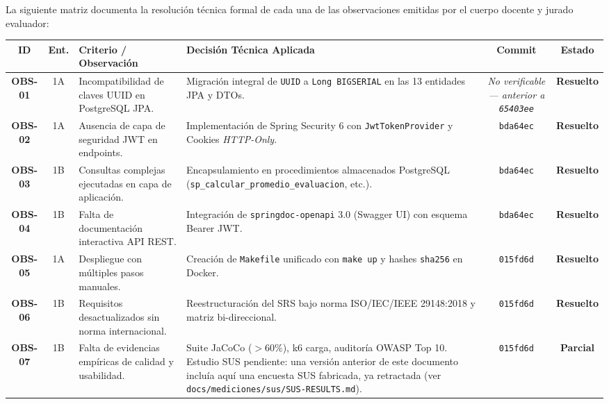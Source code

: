 \documentclass[10pt,a4paper]{article}
\begin{document}
La siguiente matriz documenta la resolución técnica formal de cada una de las observaciones emitidas por el cuerpo docente y jurado evaluador:

\vspace{0.2cm}
\begin{table}[h!]
\centering
\small
\begin{tabular}{|c|c|p{4.2cm}|p{5.5cm}|c|c|}
\hline
\rowcolor{headergray}
\textbf{ID} & \textbf{Ent.} & \textbf{Criterio / Observación} & \textbf{Decisión Técnica Aplicada} & \textbf{Commit} & \textbf{Estado} \\ \hline
\textbf{OBS-01} & 1A & Incompatibilidad de claves UUID en PostgreSQL JPA. & Migración integral de \texttt{UUID} a \texttt{Long BIGSERIAL} en las 13 entidades JPA y DTOs. & \textit{No verificable — anterior a \texttt{65403ee}} & \textbf{Resuelto} \\ \hline
\textbf{OBS-02} & 1A & Ausencia de capa de seguridad JWT en endpoints. & Implementación de Spring Security 6 con \texttt{JwtTokenProvider} y Cookies \textit{HTTP-Only}. & \texttt{bda64ec} & \textbf{Resuelto} \\ \hline
\textbf{OBS-03} & 1B & Consultas complejas ejecutadas en capa de aplicación. & Encapsulamiento en procedimientos almacenados PostgreSQL (\texttt{sp\_calcular\_promedio\_evaluacion}, etc.). & \texttt{bda64ec} & \textbf{Resuelto} \\ \hline
\textbf{OBS-04} & 1B & Falta de documentación interactiva API REST. & Integración de \texttt{springdoc-openapi} 3.0 (Swagger UI) con esquema Bearer JWT. & \texttt{bda64ec} & \textbf{Resuelto} \\ \hline
\textbf{OBS-05} & 1A & Despliegue con múltiples pasos manuales. & Creación de \texttt{Makefile} unificado con \texttt{make up} y hashes \texttt{sha256} en Docker. & \texttt{015fd6d} & \textbf{Resuelto} \\ \hline
\textbf{OBS-06} & 1B & Requisitos desactualizados sin norma internacional. & Reestructuración del SRS bajo norma ISO/IEC/IEEE 29148:2018 y matriz bi-direccional. & \texttt{015fd6d} & \textbf{Resuelto} \\ \hline
\textbf{OBS-07} & 1B & Falta de evidencias empíricas de calidad y usabilidad. & Suite JaCoCo ($>60\%$), k6 carga, auditoría OWASP Top 10. Estudio SUS pendiente: una versión anterior de este documento incluía aquí una encuesta SUS fabricada, ya retractada (ver \texttt{docs/mediciones/sus/SUS-RESULTS.md}). & \texttt{015fd6d} & \textbf{Parcial} \\ \hline
\end{tabular}
\end{table}
\end{document}
